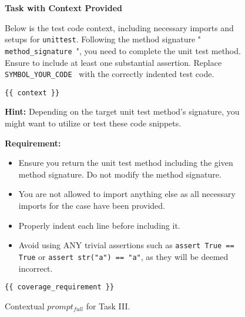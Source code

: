 \begin{figure}
\begin{tcolorbox}[colback=blue!5!white, colframe=blue!75!black]
\textbf{Task with Context Provided}

Below is the test code context, including necessary imports and setups for \texttt{unittest}. Following the method signature "\texttt{{ method\_signature }}", you need to complete the unit test method. Ensure to include at least one substantial assertion. Replace \texttt{{ SYMBOL\_YOUR\_CODE }} with the correctly indented test code.

\begin{verbatim}
{{ context }}
\end{verbatim}

\textbf{Hint:} Depending on the target unit test method's signature, you might want to utilize or test these code snippets. 

\textbf{Requirement:}
\begin{itemize}
  \item Ensure you return the unit test method including the given method signature. Do not modify the method signature.
  \item You are not allowed to import anything else as all necessary imports for the case have been provided.
  \item Properly indent each line before including it.
  \item Avoid using ANY trivial assertions such as \texttt{assert True == True} or \texttt{assert str("a") == "a"}, as they will be deemed incorrect.
\end{itemize}

\begin{verbatim}
{{ coverage_requirement }}
\end{verbatim}

\end{tcolorbox}
    \caption{Contextual $prompt_{full}$ for Task III. }
    \label{fig:task3prompt}
\end{figure}